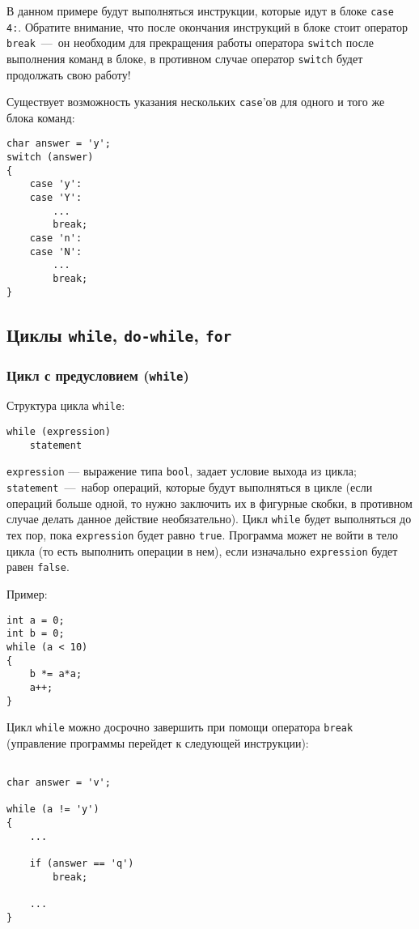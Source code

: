 В данном примере будут выполняться инструкции, которые идут в блоке \lstinline|case 4:|. Обратите внимание, что после окончания инструкций в блоке стоит оператор \lstinline|break|~---~он необходим для прекращения работы оператора \lstinline|switch| после выполнения команд в блоке, в противном случае оператор \lstinline|switch| будет продолжать свою работу!

Существует возможность указания нескольких \lstinline|case|'ов для одного и того же блока команд:

\begin{lstlisting}
char answer = 'y';
switch (answer)
{
    case 'y':
    case 'Y':
        ...
        break;
    case 'n':
    case 'N':
        ...
        break;
}
\end{lstlisting}

\subsection{Циклы \texttt{while}, \texttt{do-while}, \texttt{for}}
\subsubsection{Цикл с предусловием (\texttt{while})}
Структура цикла \lstinline|while|:
\begin{lstlisting}
while (expression)
    statement
\end{lstlisting}

\lstinline|expression| --- выражение типа \lstinline|bool|, задает условие выхода из цикла; \lstinline|statement|~---~набор операций, которые будут выполняться в цикле (если операций больше одной, то нужно заключить их в фигурные скобки, в противном случае делать данное действие необязательно). Цикл \lstinline|while| будет выполняться до тех пор, пока \lstinline|expression| будет равно \lstinline|true|. Программа может не войти в тело цикла (то есть выполнить операции в нем), если изначально \lstinline|expression| будет равен \lstinline|false|.

Пример:

\begin{lstlisting}
int a = 0;
int b = 0;
while (a < 10)
{
    b *= a*a;
    a++;
}
\end{lstlisting}

Цикл \lstinline|while| можно досрочно завершить при помощи оператора \lstinline|break| (управление программы перейдет к следующей инструкции):

\begin{lstlisting}

char answer = 'v';

while (a != 'y')
{
    ...

    if (answer == 'q')
        break;

    ...
}

\end{lstlisting}

